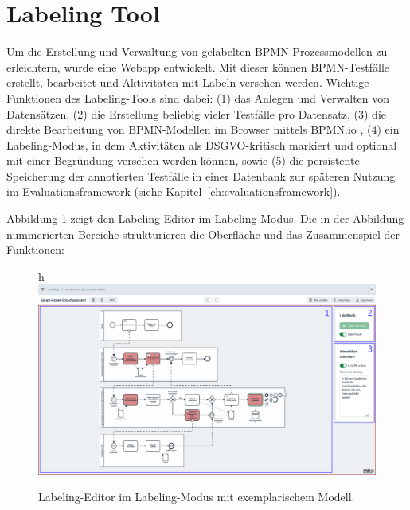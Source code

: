 \section{Labeling Tool}\label{sec:labeling-tool}

Um die Erstellung und Verwaltung von gelabelten \ac{BPMN}-Prozessmodellen zu erleichtern, wurde eine Webapp entwickelt. Mit dieser können \ac{BPMN}-Testfälle erstellt, bearbeitet und Aktivitäten mit Labeln versehen werden. Wichtige Funktionen des Labeling-Tools sind dabei: (1) das Anlegen und Verwalten von Datensätzen, (2) die Erstellung beliebig vieler Testfälle pro Datensatz, (3) die direkte Bearbeitung von \ac{BPMN}-Modellen im Browser mittels BPMN.io \cite{bpmnio}, (4) ein Labeling-Modus, in dem Aktivitäten als \ac{DSGVO}-kritisch markiert und optional mit einer Begründung versehen werden können, sowie (5) die persistente Speicherung der annotierten Testfälle in einer Datenbank zur späteren Nutzung im Evaluationsframework (siehe Kapitel~\ref{ch:evaluationsframework}).

Abbildung \ref{fig:labeling-editor} zeigt den Labeling-Editor im Labeling-Modus. Die in der Abbildung nummerierten Bereiche strukturieren die Oberfläche und das Zusammenspiel der Funktionen:

\begin{figure}{h}
    \centering
    \includegraphics[width=\textwidth]{images/labeling/labeling-editor-annotated}
    \caption{Labeling-Editor im Labeling-Modus mit exemplarischem Modell.}
    \label{fig:labeling-editor}
\end{figure}


